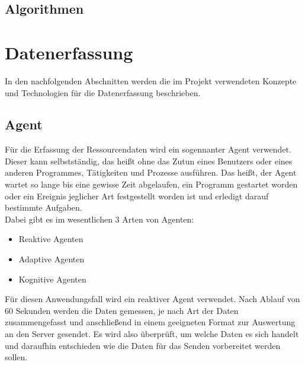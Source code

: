 \documentclass{report}
\begin{document}
\subsection{Algorithmen}

\section{Datenerfassung}
In den nachfolgenden Abschnitten werden die im Projekt verwendeten Konzepte und Technologien für die Datenerfassung beschrieben.

\subsection{Agent}
Für die Erfassung der Ressourcendaten wird ein sogennanter Agent verwendet. Dieser kann selbstständig, das heißt ohne das Zutun eines Benutzers oder eines anderen Programmes, Tätigkeiten und Prozesse ausführen. Das heißt, der Agent wartet so lange bis eine gewisse Zeit abgelaufen, ein Programm gestartet worden oder ein Ereignis jeglicher Art festgestellt worden ist und erledigt darauf bestimmte Aufgaben.\\
Dabei gibt es im wesentlichen 3 Arten von Agenten:
\begin{itemize}
    \item Reaktive Agenten
    \item Adaptive Agenten
    \item Kognitive Agenten
\end{itemize}
Für diesen Anwendungsfall wird ein reaktiver Agent verwendet. Nach Ablauf von 60 Sekunden werden die Daten gemessen, je nach Art der Daten zusammengefasst und anschließend in einem geeigneten Format zur Auswertung an den Server gesendet. Es wird also überprüft, um welche Daten es sich handelt und daraufhin entschieden wie die Daten für das Senden vorbereitet werden sollen.
\end{document}
